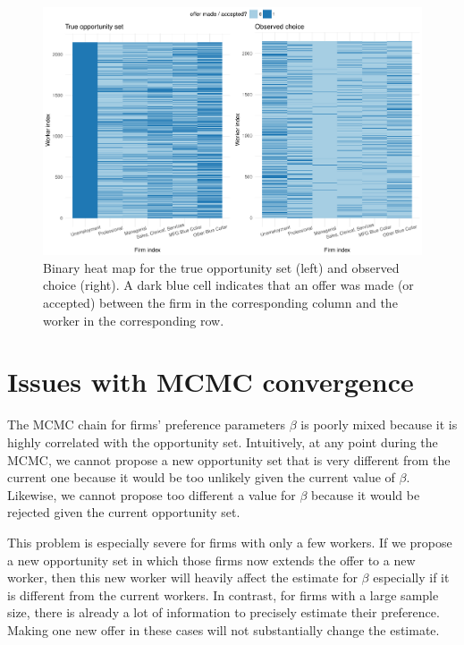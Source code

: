 \begin{figure}[!ht]
  \centering
  \includegraphics[width=\textwidth,keepaspectratio]{../figure/sim_labor_nojobs_trueopp_obschoice}
  \caption{Binary heat map for the true opportunity set (left) and observed
    choice (right). A dark blue cell indicates that an offer was made (or accepted)
    between the firm in the corresponding column and the worker in the corresponding
    row.}
  \label{fig:sim_labor_nojobs_trueopp_obschoice}
\end{figure}

\section{Issues with MCMC convergence}
\label{sec:simulation_beta_opp_correlation}

The MCMC chain for firms' preference parameters $\beta$ is poorly mixed because
it is highly correlated with the opportunity set. Intuitively, at any point
during the MCMC, we cannot propose a new opportunity set that is very different
from the current one because it would be too unlikely given the current value of
$\beta$. Likewise, we cannot propose too different a value for $\beta$ because
it would be rejected given the current opportunity set.

This problem is especially severe for firms with only a few workers. If we
propose a new opportunity set in which those firms now extends the offer to a
new worker, then this new worker will heavily affect the estimate for $\beta$
especially if it is different from the current workers. In contrast, for firms
with a large sample size, there is already a lot of information to precisely estimate
their preference. Making one new offer in these cases will not substantially change the
estimate.


